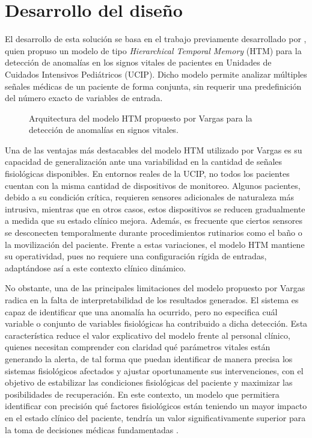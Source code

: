 \chapter{Desarrollo del diseño}

El desarrollo de esta solución se basa en el trabajo previamente desarrollado por \textcite{Vargas2023}, quien propuso un modelo de tipo \textit{Hierarchical Temporal Memory }(HTM) para la detección de anomalías en los signos vitales de pacientes en Unidades de Cuidados Intensivos Pediátricos (UCIP). Dicho modelo permite analizar múltiples señales médicas de un paciente de forma conjunta, sin requerir una predefinición del número exacto de variables de entrada.

\begin{figure}[H]
  \centering
  
  \captionsetup{justification=centering}
  \caption{Arquitectura del modelo HTM propuesto por Vargas para la detección de anomalías en signos vitales.}
  \label{fig:arquitectura_original}
\end{figure}

Una de las ventajas más destacables del modelo HTM utilizado por Vargas es su capacidad de generalización ante una variabilidad en la cantidad de señales fisiológicas disponibles. En entornos reales de la UCIP, no todos los pacientes cuentan con la misma cantidad de dispositivos de monitoreo. Algunos pacientes, debido a su condición crítica, requieren sensores adicionales de naturaleza más intrusiva, mientras que en otros casos, estos dispositivos se reducen gradualmente a medida que su estado clínico mejora. Además, es frecuente que ciertos sensores se desconecten temporalmente durante procedimientos rutinarios como el baño o la movilización del paciente. Frente a estas variaciones, el modelo HTM mantiene su operatividad, pues no requiere una configuración rígida de entradas, adaptándose así a este contexto clínico dinámico.

No obstante, una de las principales limitaciones del modelo propuesto por Vargas radica en la falta de interpretabilidad de los resultados generados. El sistema es capaz de identificar que una anomalía ha ocurrido, pero no especifica cuál variable o conjunto de variables fisiológicas ha contribuido a dicha detección. Esta característica reduce el valor explicativo del modelo frente al personal clínico, quienes necesitan comprender con claridad qué parámetros vitales están generando la alerta, de tal forma que puedan identificar de manera precisa los sistemas fisiológicos afectados y ajustar oportunamente sus intervenciones, con el objetivo de estabilizar las condiciones fisiológicas del paciente y maximizar las posibilidades de recuperación. En este contexto, un modelo que permitiera identificar con precisión qué factores fisiológicos están teniendo un mayor impacto en el estado clínico del paciente, tendría un valor significativamente superior para la toma de decisiones médicas fundamentadas \parencite{zhang2023interpretable}.

